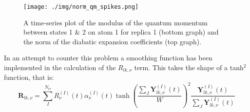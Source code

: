 \begin{figure}[H]
  \texttt{[image: ./img/norm\_qm\_spikes.png]}
  \caption{\label{fig:norm_spikes} A time-series plot of the modulus of the quantum momentum between states 1 \& 2 on atom 1 for replica 1 (bottom graph) and the norm of the diabatic expansion coefficients (top graph). }
\end{figure}
\noindent In an attempt to counter this problem a smoothing function has been implemented in the calculation of the $R_{lk, \nu}$ term. This takes the shape of a tanh$^2$ function, that is:
\begin{equation}
  \textbf{R}_{lk, \nu} = \sum_{I}^{N_{tr}} R_{\nu}^{(I)}(t) \alpha_{\nu}^{(I)}(t) \tanh\left(\frac{\sum_{J} \textbf{Y}^{(I)}_{lk, \nu}(t)}{W}\right)^2 \frac{\textbf{Y}^{(I)}_{lk, \nu}(t)}{\sum_{J} \textbf{Y}^{(I)}_{lk, \nu}(t)}
  \label{eq:tanh_smooth}
\end{equation}




\newpage
